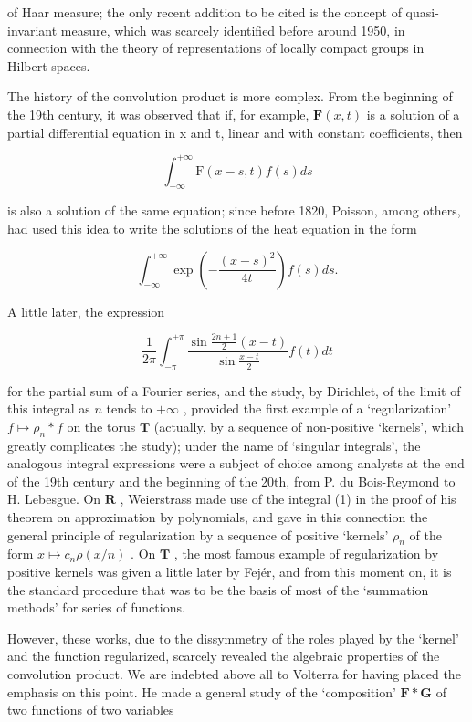 of Haar measure; the only recent addition to be cited is the concept of quasi-invariant measure, which was scarcely identified before around 1950, in connection with the theory of representations of locally compact groups in Hilbert spaces.

The history of the convolution product is more complex. From the beginning of the 19th century, it was observed that if, for example, \(\mathbf{F}(x,t)\) is a solution of a partial differential equation in x and t, linear and with constant coefficients, then

\[
\int_ {- \infty} ^ {+ \infty} \mathrm{F} (x - s, t) f (s) d s
\]

is also a solution of the same equation; since before 1820, Poisson, among others, had used this idea to write the solutions of the heat equation in the form

\[
\int_ {- \infty} ^ {+ \infty} \exp \left(- \frac {(x - s) ^ {2}}{4 t}\right) f (s) d s.\tag{1}
\]

A little later, the expression

\[
\frac {1}{2 \pi} \int_ {- \pi} ^ {+ \pi} \frac {\sin \frac {2 n + 1}{2} (x - t)}{\sin \frac {x - t}{2}} f (t) d t\tag{2}
\]

for the partial sum of a Fourier series, and the study, by Dirichlet, of the limit of this integral as \(n\) tends to \(+\infty\) , provided the first example of a `regularization' \(f \mapsto \rho_n * f\) on the torus \(\mathbf{T}\) (actually, by a sequence of non-positive `kernels', which greatly complicates the study); under the name of `singular integrals', the analogous integral expressions were a subject of choice among analysts at the end of the 19th century and the beginning of the 20th, from P. du Bois-Reymond to H. Lebesgue. On \(\mathbf{R}\) , Weierstrass made use of the integral (1) in the proof of his theorem on approximation by polynomials, and gave in this connection the general principle of regularization by a sequence of positive `kernels' \(\rho_n\) of the form \(x \mapsto c_n \rho(x/n)\) . On \(\mathbf{T}\) , the most famous example of regularization by positive kernels was given a little later by Fejér, and from this moment on, it is the standard procedure that was to be the basis of most of the `summation methods' for series of functions.

However, these works, due to the dissymmetry of the roles played by the `kernel' and the function regularized, scarcely revealed the algebraic properties of the convolution product. We are indebted above all to Volterra for having placed the emphasis on this point. He made a general study of the `composition' \(\mathbf{F}*\mathbf{G}\) of two functions of two variables

